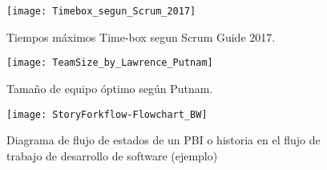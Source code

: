 \begin{figure}[h]
  \centering
  \texttt{[image: Timebox\_segun\_Scrum\_2017]}
  \caption{Tiempos máximos Time-box segun Scrum Guide 2017.}
  \centering
  \label{fig:Timebox_segun_Scrum_2017} 
\end{figure}


\begin{figure}[h]
  \centering
  \texttt{[image: TeamSize\_by\_Lawrence\_Putnam]}
  \caption{Tamaño de equipo óptimo según Putnam.}
  \centering
  \label{fig:TeamSize_by_Lawrence_Putnam} 
\end{figure}

\begin{figure}[h]
  \centering
  \texttt{[image: StoryForkflow-Flowchart\_BW]}
  \caption{Diagrama de flujo de estados de un PBI o historia en el flujo de trabajo de desarrollo de software (ejemplo)}
  \centering
  \label{fig:StoryForkflow-Flowchart_BW} 
\end{figure}
